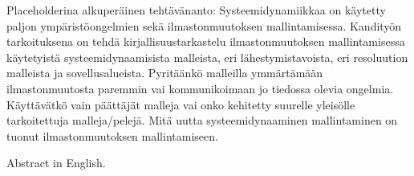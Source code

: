\documentclass[finnish,12pt,a4paper,pdftex]{article}
\begin{document}


\makecoverpage


\begin{abstractpage}[finnish]
Placeholderina alkuperäinen tehtävänanto: Systeemidynamiikkaa on käytetty paljon ympäristöongelmien sekä ilmastonmuutoksen mallintamisessa. Kandityön tarkoituksena on tehdä kirjallisuustarkastelu ilmastonmuutoksen mallintamisessa käytetyistä systeemidynaamisista malleista, eri lähestymistavoista, eri resoluution malleista ja sovellusalueista. Pyritäänkö malleilla ymmärtämään ilmastonmuutosta paremmin vai kommunikoimaan jo tiedossa olevia ongelmia. Käyttävätkö vain päättäjät malleja vai onko kehitetty suurelle yleisölle tarkoitettuja malleja/pelejä. Mitä uutta systeemidynaaminen mallintaminen on tuonut ilmastonmuutoksen mallintamiseen.
\end{abstractpage}

\newpage
%
\begin{abstractpage}[english]
 Abstract in English. 
\end{abstractpage}
\end{document}
